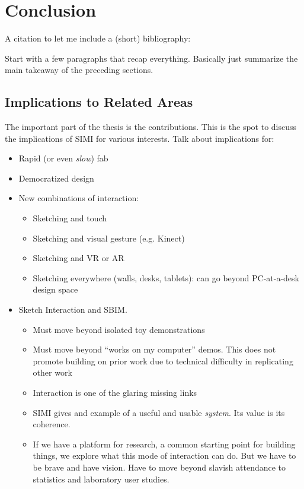 \chapter{Conclusion}

A citation to let me include a (short) bibliography: \cite{gross-boe}

Start with a few paragraphs that recap everything. Basically just
summarize the main takeaway of the preceding sections.

\section{Implications to Related Areas}

The important part of the thesis is the contributions. This is the
spot to discuss the implications of SIMI for various interests. Talk
about implications for:

\begin{itemize}
\item Rapid (or even \textit{slow}) fab
\item Democratized design
\item New combinations of interaction:
  \begin{itemize}
  \item Sketching and touch
  \item Sketching and visual gesture (e.g. Kinect)
  \item Sketching and VR or AR
  \item Sketching everywhere (walls, desks, tablets): can go beyond PC-at-a-desk design space
  \end{itemize}
\item Sketch Interaction and SBIM. 
  \begin{itemize}
  \item Must move beyond isolated toy demonstrations
  \item Must move beyond ``works on my computer'' demos. This does not
    promote building on prior work due to technical difficulty in
    replicating other work
  \item Interaction is one of the glaring missing links
  \item SIMI gives and example of a useful and usable
    \textit{system}. Its value is its coherence.
  \item If we have a platform for research, a common starting point
    for building things, we explore what this mode of interaction can
    do. But we have to be brave and have vision. Have to move beyond
    slavish attendance to statistics and laboratory user studies.
  \end{itemize}
\end{itemize}

